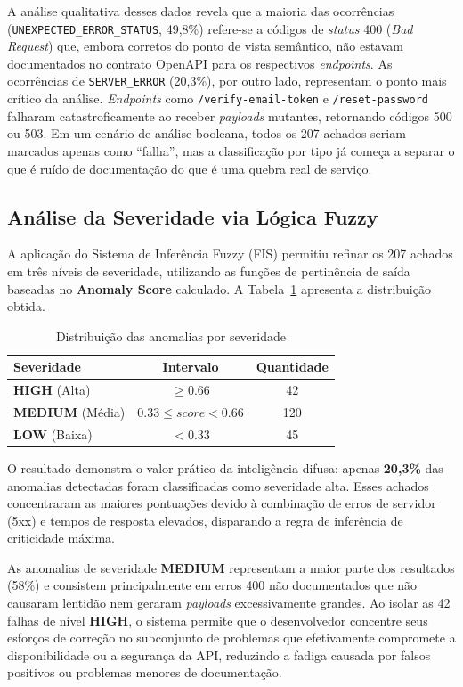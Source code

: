 A análise qualitativa desses dados revela que a maioria das ocorrências (\texttt{UNEXPECTED\_ERROR\_STATUS}, 49,8\%) refere-se a códigos de \textit{status} 400 (\textit{Bad Request}) que, embora corretos do ponto de vista semântico, não estavam documentados no contrato OpenAPI para os respectivos \textit{endpoints}. As ocorrências de \texttt{SERVER\_ERROR} (20,3\%), por outro lado, representam o ponto mais crítico da análise. \textit{Endpoints} como \texttt{/verify-email-token} e \texttt{/reset-password} falharam catastroficamente ao receber \textit{payloads} mutantes, retornando códigos 500 ou 503. Em um cenário de análise booleana, todos os 207 achados seriam marcados apenas como ``falha'', mas a classificação por tipo já começa a separar o que é ruído de documentação do que é uma quebra real de serviço.

\subsection{Análise da Severidade via Lógica Fuzzy}

A aplicação do Sistema de Inferência Fuzzy (FIS) permitiu refinar os 207 achados em três níveis de severidade, utilizando as funções de pertinência de saída baseadas no \textbf{Anomaly Score} calculado. A Tabela~\ref{tab:severidade} apresenta a distribuição obtida.

\begin{table}[H]
\centering
\caption{Distribuição das anomalias por severidade}
\label{tab:severidade}
\footnotesize
\begin{tabular}{lcc}
\hline
\textbf{Severidade} & \textbf{Intervalo} & \textbf{Quantidade} \\
\hline
\textbf{HIGH} (Alta) & $\geq 0.66$ & 42 \\
\textbf{MEDIUM} (Média) & $0.33 \leq score < 0.66$ & 120 \\
\textbf{LOW} (Baixa) & $< 0.33$ & 45 \\
\hline
\end{tabular}
\end{table}

O resultado demonstra o valor prático da inteligência difusa: apenas \textbf{20,3\%} das anomalias detectadas foram classificadas como severidade alta. Esses achados concentraram as maiores pontuações devido à combinação de erros de servidor (5xx) e tempos de resposta elevados, disparando a regra de inferência de criticidade máxima.

As anomalias de severidade \textbf{MEDIUM} representam a maior parte dos resultados (58\%) e consistem principalmente em erros 400 não documentados que não causaram lentidão nem geraram \textit{payloads} excessivamente grandes. Ao isolar as 42 falhas de nível \textbf{HIGH}, o sistema permite que o desenvolvedor concentre seus esforços de correção no subconjunto de problemas que efetivamente compromete a disponibilidade ou a segurança da API, reduzindo a fadiga causada por falsos positivos ou problemas menores de documentação.

